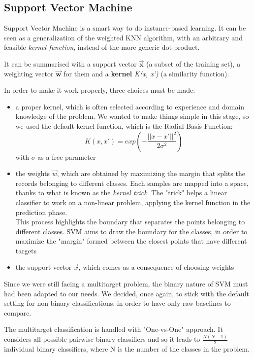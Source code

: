\subsection{Support Vector Machine}
Support Vector Machine is a smart way to do instance-based learning. It can be seen as a generalization of the weighted KNN algorithm, with an arbitrary and feasible \textit{kernel function}, instead of the more generic dot product.

It can be summarised with a support vector $ \mathbf{\vec{x}} $ (a subset of the training set), a weighting vector $ \mathbf{\vec{w}} $ for them and a \textbf{kernel} \textit{K(x, x')} (a similarity function).

In order to make it work properly, three choices must be made:
\begin{itemize}
	\item[\PencilRight] a proper kernel, which is often selected according to experience and domain knowledge of the problem. We wanted to make things simple in this stage, so we used the default kernel function, which is the Radial Basis Function:
	\[ K(x, x') = exp(- \frac{||x-x'||^{2}}{2\sigma^{2}}) \]
	with $ \sigma $ as a free parameter
	\item[\PencilRight] the weights $ \vec{w} $, which are obtained by maximizing the margin that splits the records belonging to different classes. Each samples are mapped into a space, thanks to what is known as the \textit{kernel trick}. The "trick" helps a linear classifier to work on a non-linear problem, applying the kernel function in the prediction phase.\\This process highlights the boundary that separates the points belonging to different classes.
	SVM aims to draw the boundary for the classes, in order to maximize the "margin" formed between the closest points that have different targets
	\item[\PencilRight] the support vector $ \vec{x} $, which comes as a consequence of choosing weights
\end{itemize}
Since we were still facing a multitarget problem, the binary nature of SVM must had been adapted to our needs. We decided, once again, to stick with the default setting for non-binary classifications, in order to have only raw baselines to compare.

The multitarget classification is handled with "One-vs-One" approach.
It considers all possible pairwise binary classifiers and so it leads to $\frac{N(N-1)}{2}$ individual binary classifiers, where N is the number of the classes in the problem.

